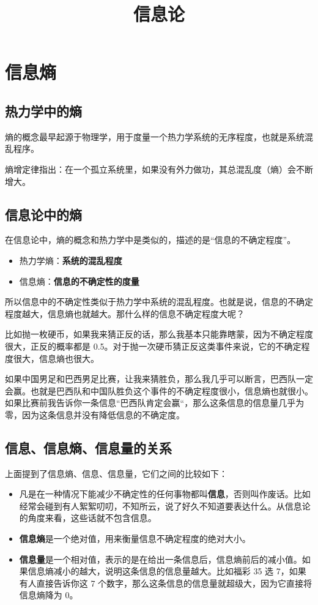 \documentclass[12pt]{article}
\title{信息论\cite{InfomationTheory_Example_Poison}}
\begin{document}
\maketitle
\tableofcontents

\section{信息熵}
\subsection{热力学中的熵}
熵的概念最早起源于物理学，用于度量一个热力学系统的无序程度，也就是系统混乱程序。

熵增定律指出：在一个孤立系统里，如果没有外力做功，其总混乱度（熵）会不断增大。

\subsection{信息论中的熵}
在信息论中，熵的概念和热力学中是类似的，描述的是“信息的不确定程度”。

\begin{itemize}[itemindent=2em]
    \item 热力学熵：\textbf{系统的混乱程度}
    
    \item 信息熵：\textbf{信息的不确定性的度量}
\end{itemize}

所以信息中的不确定性类似于热力学中系统的混乱程度。也就是说，信息的不确定程度越大，信息熵也就越大。那什么样的信息不确定程度大呢？

比如抛一枚硬币，如果我来猜正反的话，那么我基本只能靠瞎蒙，因为不确定程度很大，正反的概率都是 0.5。对于抛一次硬币猜正反这类事件来说，它的不确定程度很大，信息熵也很大。

如果中国男足和巴西男足比赛，让我来猜胜负，那么我几乎可以断言，巴西队一定会赢。也就是巴西队和中国队胜负这个事件的不确定程度很小，信息熵也就很小。如果比赛前我告诉你一条信息“巴西队肯定会赢“，那么这条信息的信息量几乎为零，因为这条信息并没有降低信息的不确定度。

\subsection{信息、信息熵、信息量的关系}
上面提到了信息熵、信息、信息量，它们之间的比较如下：

\begin{itemize}[itemindent=2em]
    \item 凡是在一种情况下能减少不确定性的任何事物都叫\textbf{信息}，否则叫作废话。比如经常会碰到有人絮絮叨叨，不知所云，说了好久不知道要表达什么。从信息论的角度来看，这些话就不包含信息。
    
    \item \textbf{信息熵}是一个绝对值，用来衡量信息不确定程度的绝对大小。
    
    \item \textbf{信息量}是一个相对值，表示的是在给出一条信息后，信息熵前后的减小值。如果信息熵减小的越大，说明这条信息的信息量越大。比如福彩 35 选 7，如果有人直接告诉你这 7 个数字，那么这条信息的信息量就超级大，因为它直接将信息熵降为 0。
\end{itemize}
\end{document}
